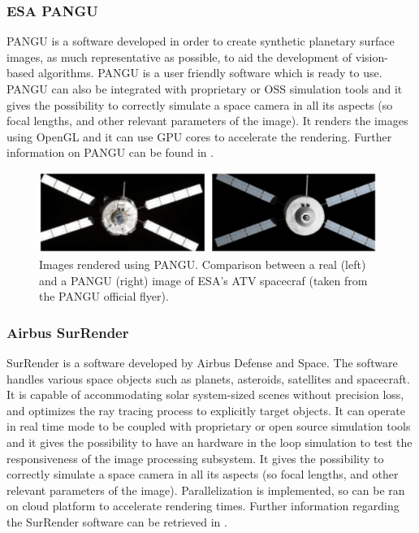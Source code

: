\subsubsection{ESA PANGU}
PANGU is a software developed in order to create synthetic planetary surface images, as much representative as possible, to aid the development of vision-based algorithms. PANGU is a user friendly software which is ready to use. PANGU can also be integrated with proprietary or OSS simulation tools and it gives the possibility to correctly simulate a space camera in all its aspects (so focal lengths, and other relevant parameters of the image). It renders the images using OpenGL and it can use GPU cores to accelerate the rendering. Further information on PANGU can be found in \cite{10.2514/6.2004-592-389}.

\begin{figure}[htbp]
  \centering
  \includegraphics[width=0.98\textwidth]{gfx/pangu.eps}
  \caption{Images rendered using PANGU. Comparison between a real (left) and a PANGU (right) image of ESA’s ATV spacecraf (taken from the PANGU official flyer).}
  \label{fig:PANGU}
\end{figure}

\subsubsection{Airbus SurRender}
SurRender is a software developed by Airbus Defense and Space. The software handles various space objects such as planets, asteroids, satellites and spacecraft. It is capable of accommodating solar system-sized scenes without precision loss, and optimizes the ray tracing process to explicitly target objects. It can operate in real time mode to be coupled with  proprietary or open source simulation tools and it gives the possibility to have an hardware in the loop simulation to test the responsiveness of the image processing subsystem. It gives the possibility to correctly simulate a space camera in all its aspects (so focal lengths, and other relevant parameters of the image). Parallelization is implemented, so can be ran on cloud platform to accelerate rendering times. Further information regarding the SurRender software can be retrieved in \cite{Brochard2018ScientificIR}.

